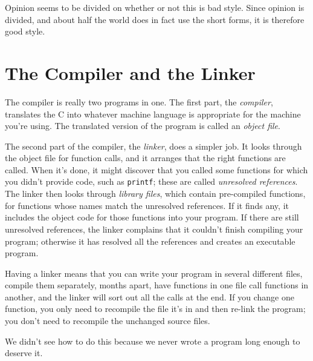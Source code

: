Opinion seems to be divided on whether or not this is bad style.  Since
opinion is divided, and about half the world does in fact use the short
forms, it is therefore good style.

\section{The Compiler and the Linker}
\label{linker}

The compiler is really two programs in one.  The first part, the {\em
compiler}\/, translates the C into whatever machine language is
appropriate for the machine you're using.  The translated version of the
program is called an {\em object file}\/. 

The second part of the compiler, the {\em linker}\/, does a simpler job.
It looks through the object file for function calls, and it arranges
that the right functions are called.  When it's done, it might discover
that you called some functions for which you didn't provide code, such
as {\tt printf}; these are called {\em unresolved references}\/.  The
linker then looks through {\em library files}\/, which contain
pre-compiled functions, for functions whose names match the unresolved
references.  If it finds any, it includes the object code for those
functions into your program.  If there are still unresolved references,
the linker complains that it couldn't finish compiling your program;
otherwise it has resolved all the references and creates an executable
program.

Having a linker means that you can write your program in several
different files, compile them separately, months apart, have functions
in one file call functions in another, and the linker will sort out all
the calls at the end. If you change one function, you only need to
recompile the file it's in and then re-link the program; you don't need
to recompile the unchanged source files.  

We didn't see how to do this because we never wrote a program long
enough to deserve it.

